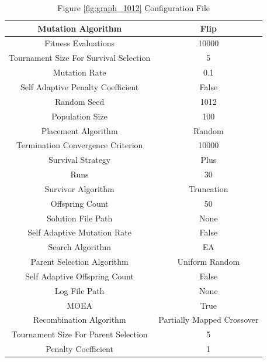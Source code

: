 \documentclass{standalone}
\begin{document}
\begin{table}[!htb]
	\centering
	\caption{Figure \ref{fig:graph_1012} Configuration File}
	\label{tab:graph_1012}
	\begin{tabular}{| c | c |}
		\hline
		Mutation Algorithm		& Flip		 \\
		\hline
		Fitness Evaluations		& 10000		 \\
		\hline
		Tournament Size For Survival Selection		& 5		 \\
		\hline
		Mutation Rate		& 0.1		 \\
		\hline
		Self Adaptive Penalty Coefficient		& False		 \\
		\hline
		Random Seed		& 1012		 \\
		\hline
		Population Size		& 100		 \\
		\hline
		Placement Algorithm		& Random		 \\
		\hline
		Termination Convergence Criterion		& 10000		 \\
		\hline
		Survival Strategy		& Plus		 \\
		\hline
		Runs		& 30		 \\
		\hline
		Survivor Algorithm		& Truncation		 \\
		\hline
		Offspring Count		& 50		 \\
		\hline
		Solution File Path		& None		 \\
		\hline
		Self Adaptive Mutation Rate		& False		 \\
		\hline
		Search Algorithm		& EA		 \\
		\hline
		Parent Selection Algorithm		& Uniform Random		 \\
		\hline
		Self Adaptive Offspring Count		& False		 \\
		\hline
		Log File Path		& None		 \\
		\hline
		MOEA		& True		 \\
		\hline
		Recombination Algorithm		& Partially Mapped Crossover		 \\
		\hline
		Tournament Size For Parent Selection		& 5		 \\
		\hline
		Penalty Coefficient		& 1		 \\
		\hline
	\end{tabular}
\end{table}
\end{document}
